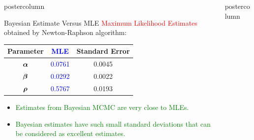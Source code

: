 \documentclass[final]{beamer}\usepackage[]{graphicx}\usepackage[]{color}
\newcommand{\balpha}{\mbox{\boldmath $\alpha$} }
\newcommand{\bbeta}{\mbox{\boldmath $\beta$} }
\newcommand{\brho}{\mbox{\boldmath $\rho$} }
\newcommand{\red}{\textcolor{red}}
\newcommand{\green}{\textcolor{green}}
\newcommand{\blue}{\textcolor{blue}}
\newlength{\columnheight}\setlength{\columnheight}{75cm} %
\begin{document}
{\begin{frame}
\begin{columns}
\begin{column}{.33\textwidth}
\begin{beamercolorbox}[center,wd=\textwidth]{postercolumn}
\begin{minipage}[T]{.97\textwidth}
{\begin{block}{Bayesian Estimate Versus MLE}
\red{Maximum Likelihood Estimates} obtained by Newton-Raphson algorithm:
  \begin{center}
  \renewcommand\arraystretch{1.3}
  \begin{tabular}{c|cc}
  \textbf{Parameter}  & \blue{\textbf{MLE}} & \textbf{Standard Error} \\ \hline
  \large{$\balpha$}    & \blue{\large{0.0761}}     & \large{0.0045} \\ %
  \large{$\bbeta$}     & \blue{\large{0.0292}}     & \large{0.0022} \\ %
  \large{$\brho$}      & \blue{\large{0.5767}}     & \large{0.0193} \\ %
  \end{tabular}
  \end{center}
\begin{itemize}
  \item \green{Estimates from Bayesian MCMC are very close to MLEs.}
  \item \green{Bayesian estimates have such small standard deviations that can be considered as excellent estimates.}
  
\end{itemize}

\end{block}
\vfill
}

\end{minipage}
\end{beamercolorbox}
\end{column}
\begin{column}{.33\textwidth}
\begin{beamercolorbox}[center,wd=\textwidth]{postercolumn}
\begin{minipage}[T]{.97\textwidth}  %
\parbox[t][\columnheight]{\textwidth}{ %


}
\end{minipage}
\end{beamercolorbox}
\end{column}
\end{columns}
\end{frame}}
\end{document}
